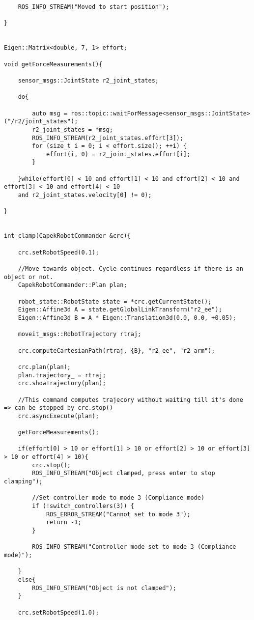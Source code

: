 \begin{lstlisting}
	ROS_INFO_STREAM("Moved to start position");

}


Eigen::Matrix<double, 7, 1> effort;

void getForceMeasurements(){

	sensor_msgs::JointState r2_joint_states;

	do{

		auto msg = ros::topic::waitForMessage<sensor_msgs::JointState>("/r2/joint_states");
		r2_joint_states = *msg;
		ROS_INFO_STREAM(r2_joint_states.effort[3]);
		for (size_t i = 0; i < effort.size(); ++i) {
			effort(i, 0) = r2_joint_states.effort[i];
		}

	}while(effort[0] < 10 and effort[1] < 10 and effort[2] < 10 and effort[3] < 10 and effort[4] < 10 
	and r2_joint_states.velocity[0] != 0);
 
}


int clamp(CapekRobotCommander &crc){

	crc.setRobotSpeed(0.1);
	
	//Move towards object. Cycle continues regardless if there is an object or not. 
	CapekRobotCommander::Plan plan;

	robot_state::RobotState state = *crc.getCurrentState();
	Eigen::Affine3d A = state.getGlobalLinkTransform("r2_ee");
	Eigen::Affine3d B = A * Eigen::Translation3d(0.0, 0.0, +0.05);

	moveit_msgs::RobotTrajectory rtraj;

	crc.computeCartesianPath(rtraj, {B}, "r2_ee", "r2_arm");

	crc.plan(plan);
	plan.trajectory_ = rtraj;
	crc.showTrajectory(plan);

	//This command computes trajecory without waiting till it's done => can be stopped by crc.stop()
	crc.asyncExecute(plan);

	getForceMeasurements();

	if(effort[0] > 10 or effort[1] > 10 or effort[2] > 10 or effort[3] > 10 or effort[4] > 10){
		crc.stop();
		ROS_INFO_STREAM("Object clamped, press enter to stop clamping");

		//Set controller mode to mode 3 (Compliance mode)
		if (!switch_controllers(3)) {
			ROS_ERROR_STREAM("Cannot set to mode 3");
			return -1;
		}

		ROS_INFO_STREAM("Controller mode set to mode 3 (Compliance mode)");
		
	}
	else{
		ROS_INFO_STREAM("Object is not clamped");
	}

	crc.setRobotSpeed(1.0);


\end{lstlisting}
